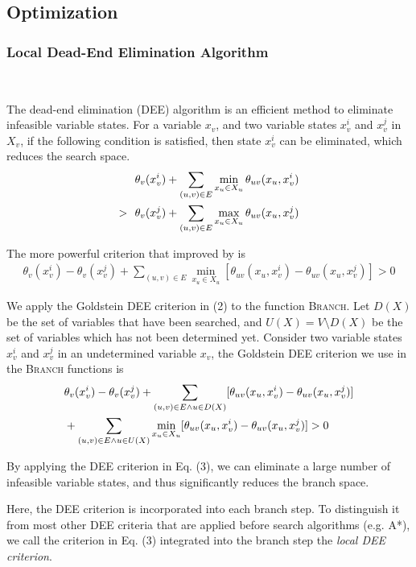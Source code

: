 \subsection{Optimization}

\subsubsection{Local Dead-End Elimination Algorithm}\

The dead-end elimination (DEE) algorithm is an efficient method to eliminate infeasible variable states. For a variable $x_v$, and two variable states $x_v^i$ and $x_v^j$ in $X_v$, if the following condition is satisfied, then state $x_v^i$ can be eliminated, which reduces the search space.
\begin{align}
& \theta_v(x_v^i)+\sum_{(u,v)\in E}\min_{x_u\in X_u}\theta_{uv}(x_u,x_v^i) \notag \\
>\ \ & \theta_v(x_v^j)+\sum_{(u,v)\in E}\max_{x_u\in X_u}\theta_{uv}(x_u,x_v^j)
\end{align}

The more powerful criterion that improved by \cite{goldstein1994efficient} is
\begin{align}
\theta_v(x_v^i)-\theta_v(x_v^j)+\sum_{(u,v)\in E}\min_{x_u\in X_u}[\theta_{uv}(x_u,x_v^i)-\theta_{uv}(x_u,x_v^j)] > 0
\end{align}

We apply the Goldstein DEE criterion in (2) to the function \textsc{Branch}. Let $D(X)$ be the set of variables that have been searched, and $U(X)=V\setminus D(X)$ be the set of variables which has not been determined yet. Consider two variable states $x_v^i$ and $x_v^j$ in an undetermined variable $x_v$, the Goldstein DEE criterion we use in the \textsc{Branch} functions is
\begin{align}
& \theta_v(x_v^i)-\theta_v(x_v^j)+\sum_{(u,v)\in E\wedge u\in D(X)}[\theta_{uv}(x_u,x_v^i)-\theta_{uv}(x_u,x_v^j)] \notag \\
& +\sum_{(u,v)\in E\wedge u\in U(X)}\min_{x_u\in X_u}[\theta_{uv}(x_u,x_v^i)-\theta_{uv}(x_u,x_v^j)] > 0
\end{align}

By applying the DEE criterion in Eq. (3), we can eliminate a large number of infeasible variable states, and thus significantly reduces the branch space.

Here, the DEE criterion is incorporated into each branch step. To distinguish it from most other DEE criteria that are applied before search algorithms (e.g. A*\cite[]{gainza2013osprey}), we call the criterion in Eq. (3) integrated into the branch step the \textit{local DEE criterion}.

